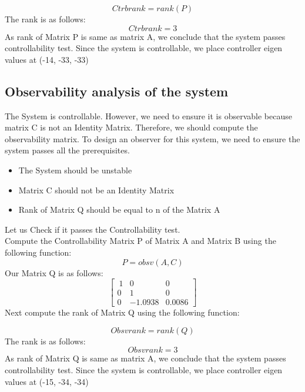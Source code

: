 \documentclass{article}
\begin{document}
\begin{equation}
Ctrb rank = rank(P)
\end{equation}
\noindent The rank is as follows:
\begin{equation}
 Ctrbrank = 3
\end{equation}
\vskip20pt
\noindent As rank of Matrix P is same as matrix A, we conclude that the system passes controllability test. Since the system is controllable, we place controller eigen values at (-14, -33, -33)
\pagebreak
\subsection{Observability analysis of the system}
\noindent The System is controllable. However, we need to ensure it is observable because matrix C is not an Identity Matrix. Therefore, we should compute the observability matrix. To design an observer for this system, we need to ensure the system passes all the prerequisites.\\

\begin{itemize}
\item The System should be unstable
\item Matrix C should not be an Identity Matrix
\item Rank of Matrix Q should be equal to n of the Matrix A
\end{itemize}

\noindent Let us Check if it passes the Controllability test. \\
\vskip10pt
\noindent Compute the Controllability Matrix P of Matrix A and Matrix B using the following function: \begin{equation} P = obsv(A, C) \end{equation}\vskip10pt
\noindent Our Matrix Q is as follows:
\begin{equation}
\begin{bmatrix}
\
1 & 0 & 0 \\
0 & 1 & 0\\
0 & -1.0938 & 0.0086  \end{bmatrix}
\end{equation}
\vskip10pt
\noindent Next compute the rank of Matrix Q using the following function: 

\begin{equation}
Obsv rank = rank(Q)
\end{equation}
\noindent The rank is as follows:
\begin{equation}
 Obsv rank = 3
\end{equation}
\vskip20pt
\noindent As rank of Matrix Q is same as matrix A, we conclude that the system passes controllability test. Since the system is controllable, we place controller eigen values at (-15, -34, -34)
\pagebreak
\end{document}
